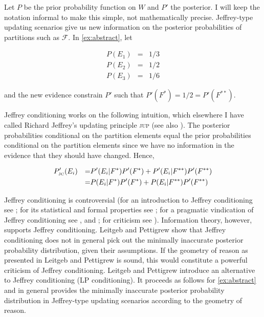 \documentclass[12pt]{article}
\begin{document}
Let $P$ be the prior probability function on $W$ and $P'$ the
posterior. I will keep the notation informal to make this simple, not
mathematically precise. Jeffrey-type updating scenarios give us new
information on the posterior probabilities of partitions such as
$\mathcal{F}$. In {\xample} \ref{ex:abstract}, let

\begin{equation}
  \label{eq:priors}
  \begin{array}{rcl}
    P(E_{1})&=&1/3 \\
    P(E_{2})&=&1/2 \\
    P(E_{3})&=&1/6
  \end{array}
\end{equation}

and the new evidence constrain $P'$ such that
$P'(F^{*})=1/2=P'(F^{**})$.

Jeffrey conditioning works on the following intuition, which elsewhere
I have called Richard Jeffrey's updating principle \textsc{jup} (see
also ). The posterior probabilities conditional
on the partition elements equal the prior probabilities conditional on
the partition elements since we have no information in the evidence
that they should have changed. Hence,

\begin{align}
  \label{eq:jc}
  &P'_{\mbox{\tiny JC}}(E_{i})&=&P'(E_{i}|F^{*})P'(F^{*})+P'(E_{i}|F^{**})P'(F^{**})\notag \\
  &&=&P(E_{i}|F^{*})P'(F^{*})+P(E_{i}|F^{**})P'(F^{**})
\end{align}

Jeffrey conditioning is controversial (for an introduction to Jeffrey
conditioning see ; for its statistical and
formal properties see ; for a pragmatic
vindication of Jeffrey conditioning see , and
; for criticism see
). Information theory, however, supports
Jeffrey conditioning. Leitgeb and Pettigrew show that Jeffrey
conditioning does not in general pick out the minimally inaccurate
posterior probability distribution, given their assumptions. If the
geometry of reason as presented in Leitgeb and Pettigrew is sound,
this would constitute a powerful criticism of Jeffrey conditioning.
Leitgeb and Pettigrew introduce an alternative to Jeffrey conditioning
(LP conditioning). It proceeds as follows for {\xample}
\ref{ex:abstract} and in general provides the minimally inaccurate
posterior probability distribution in Jeffrey-type updating scenarios
according to the geometry of reason.
\end{document}
